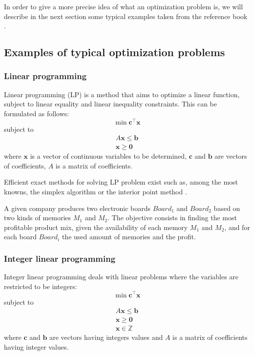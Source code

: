 In order to give a more precise idea of what an optimization problem is, we will describe in the next section some typical examples taken from the reference book \cite{talbi09, BraMar2002}.

\subsection{Examples of typical optimization problems}
\subsubsection{Linear programming}
Linear programming (LP) is a method that aims to optimize a linear function, subject to linear equality and linear inequality constraints. This can be formulated as follows:
\begin{equation}
\min \mathbf{c}^\intercal\mathbf{x}
\end{equation}
subject to
\begin{equation*}
\begin{gathered}
A\mathbf{x} \leq \mathbf{b}\\
\mathbf{x} \geq \mathbf{0}
\end{gathered}
\end{equation*}
where $\mathbf{x}$ is a vector of continuous variables to be determined, $\mathbf{c}$ and $\mathbf{b}$ are vectors of coefficients, $A$ is a matrix of coefficients.

Efficient exact methods for solving LP problem exist such as, among the most knowns, the simplex algorithm \cite{dantzig51} or the interior point method \cite{Karmarkar84}.

\begin{example}
A given company produces two electronic boards $Board_1$ and $Board_2$ based on two kinds of memories $M_1$ and $M_2$. The objective consists in finding the most profitable product mix, given the availability of each memory $M_1$ and $M_2$, and for each board $Board_i$ the used amount of memories and the profit. 
\end{example}

\subsubsection{Integer linear programming}
Integer linear programming deals with linear problems where the variables are restricted to be integers:
\begin{equation}
\min \mathbf{c}^\intercal\mathbf{x}
\end{equation}
subject to
\begin{equation*}
\begin{gathered}
A\mathbf{x} \leq \mathbf{b}\\
\mathbf{x} \geq \mathbf{0}\\
\mathbf{x} \in \mathbb{Z}
\end{gathered}
\end{equation*}
where $\mathbf{c}$ and $\mathbf{b}$ are vectors having integers values and $A$ is a matrix of coefficients having integer values.

